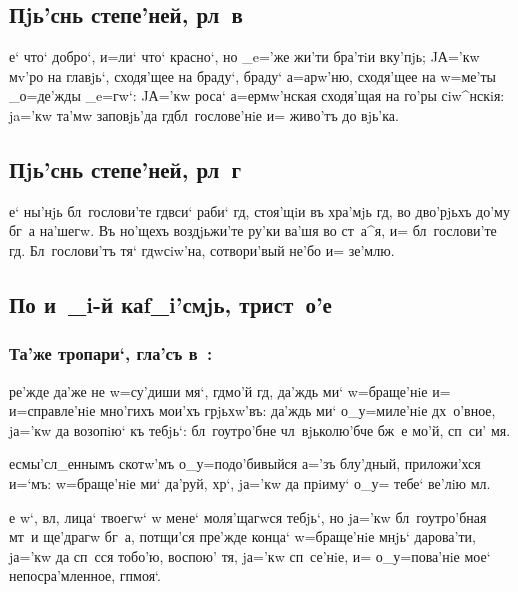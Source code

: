 \documentclass[12pt,twoside,a6paper,xdvi,civil=antiqua]{hipbook}
\begin{document}
\delimpict

\subsection{Пjь'снь степе'ней, рл~в}

е` что` добро`, и=ли` что` красно`, но _e='же жи'ти бра'тiи вку'пjь;
JА='кw мv'ро на гла\-вjь`, схо\-дя'\-щее на браду`, браду` а=арw'ню,
схо\-дя'\-щее на w=ме'ты _о=де'жды _e=гw`: JА='кw роса` а=ермw'нская сходя'щая
на го'ры сiw^нскiя: ja='кw та'мw заповjь'да гд бл~гослове'нiе и= живо'тъ до
вjь'ка.

\delimpict

\subsection{Пjь'снь степе'ней, рл~г}

е` ны'нjь бл~гослови'те гд вси` раби` гд, стоя'щiи въ хра'мjь
гд, во дво'рjьхъ до'му бг~а на'шегw. Въ но'щехъ воздjьжи'те ру'ки ва'шя во
ст~а^я, и= бл~гослови'те гд. Бл~гослови'тъ тя` гд w\т сiw'на,
сотвори'вый не'бо и= зе'млю.

\slava

\delimpict

\subsection{По и~_i-й каf_i'смjь, трист~о'е}

\subsubsection{Та'же тропари`, гла'съ в~:}

ре'жде да'же не w=су'диши мя`, гд мо'й гд, да'ждь ми`
w=браще'нiе и= и=справле'нiе мно'гихъ мои'хъ грjьхw'въ: да'ждь ми`
о_у=\-ми\-ле'\-нiе дх~о'вное, jа='кw да возопiю` къ тебjь`: бл~гоутро'бне
чл~вjьколю'бче бж~е мо'й, сп~си' мя.


 есмы'сл_еннымъ скотw'мъ
о_у=\-по\-до'\-би\-вый\-ся а='зъ блу'дный, приложи'хся и=`мъ: w=браще'нiе ми`
да'руй, хр`, jа='кw да прiиму` о_у= тебе` ве'лiю мл.

 е w`, вл, лица` твоегw` w\т
мене` моля'щагwся тебjь`, но jа='кw бл~гоутро'бная мт~и ще'драгw бг~а,
потщи'ся пре'жде конца` w=браще'нiе мнjь` дарова'ти, jа='кw да сп~сся тобо'ю,
воспою' тя, jа='кw сп~се'нiе, и= о_у=пова'нiе мое` непосра'мленное, гп моя`.
\end{document}
